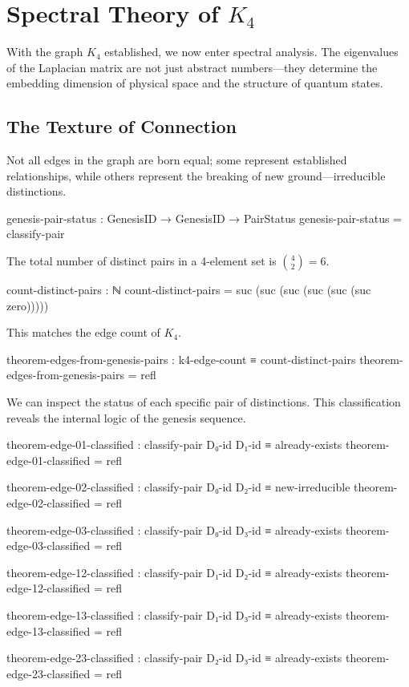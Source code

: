 \documentclass[11pt,a4paper]{book}
\begin{document}
\chapter[Spectral Theory of K4]{Spectral Theory of $K_4$}
\label{chap:spectral-k4}

With the graph $K_4$ established, we now enter spectral analysis. The eigenvalues of the 
Laplacian matrix are not just abstract numbers—they determine the embedding dimension 
of physical space and the structure of quantum states.

\section{The Texture of Connection}

Not all edges in the graph are born equal; some represent established relationships, while others represent the breaking of new ground---irreducible distinctions.

\begin{code}
genesis-pair-status : GenesisID → GenesisID → PairStatus
genesis-pair-status = classify-pair

\end{code}

The total number of distinct pairs in a 4-element set is $\binom{4}{2} = 6$.

\begin{code}
count-distinct-pairs : ℕ
count-distinct-pairs = suc (suc (suc (suc (suc (suc zero)))))

\end{code}

This matches the edge count of $K_4$.

\begin{code}
theorem-edges-from-genesis-pairs : k4-edge-count ≡ count-distinct-pairs
theorem-edges-from-genesis-pairs = refl

\end{code}

We can inspect the status of each specific pair of distinctions. This classification reveals the internal logic of the genesis sequence.

\begin{code}
theorem-edge-01-classified : classify-pair D₀-id D₁-id ≡ already-exists
theorem-edge-01-classified = refl

theorem-edge-02-classified : classify-pair D₀-id D₂-id ≡ new-irreducible
theorem-edge-02-classified = refl

theorem-edge-03-classified : classify-pair D₀-id D₃-id ≡ already-exists
theorem-edge-03-classified = refl

theorem-edge-12-classified : classify-pair D₁-id D₂-id ≡ already-exists
theorem-edge-12-classified = refl

theorem-edge-13-classified : classify-pair D₁-id D₃-id ≡ already-exists
theorem-edge-13-classified = refl

theorem-edge-23-classified : classify-pair D₂-id D₃-id ≡ already-exists
theorem-edge-23-classified = refl

\end{code}
\end{document}
